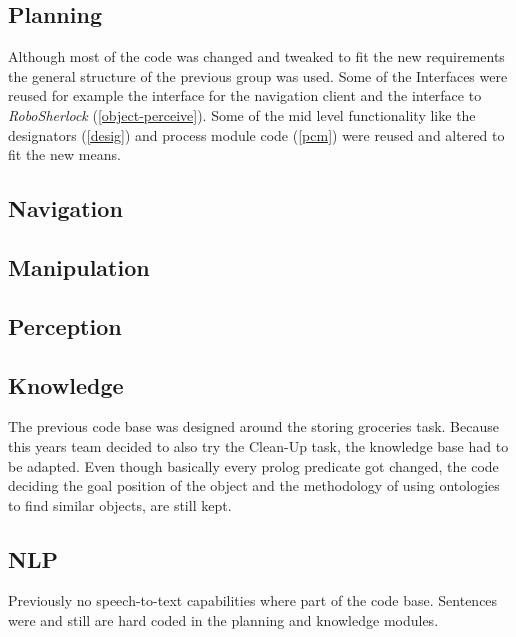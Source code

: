 \documentclass[main.tex]{subfiles}
\begin{document}
	\subsection{Planning}
		Although most of the code was changed and tweaked to fit the new requirements the general structure of the previous group was used. Some of the Interfaces were reused for example the interface for the navigation client and the interface to \textit{RoboSherlock} (\ref{object-perceive}). Some of the mid level functionality like the designators (\ref{desig}) and process module code (\ref{pcm}) were reused and altered to fit the new means.
	\subsection{Navigation}
	\subsection{Manipulation}
	\subsection{Perception}
	\subsection{Knowledge}
        The previous code base was designed around the storing groceries task. Because this years team decided to also try the Clean-Up task, the knowledge base had to be adapted. Even though basically every prolog predicate got changed, the code deciding the goal position of the object and the methodology of using ontologies to find similar objects, are still kept.
    \subsection{NLP}
        Previously no speech-to-text capabilities where part of the code base. Sentences were and still are hard coded in the planning and knowledge modules.
\end{document}
